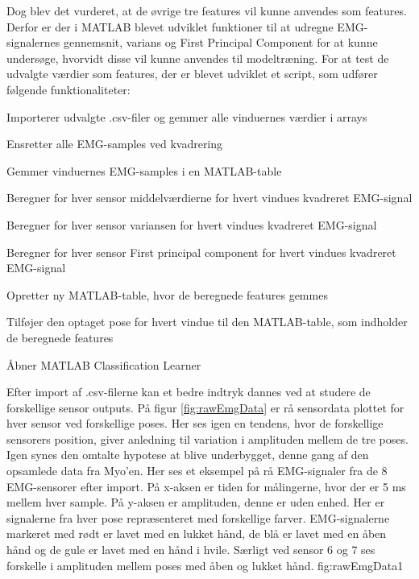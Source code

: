 Dog blev det vurderet, at de øvrige tre features vil kunne anvendes som features. Derfor er der i MATLAB blevet udviklet funktioner til at udregne EMG-signalernes gennemsnit, varians og First Principal Component for at kunne undersøge, hvorvidt disse vil kunne anvendes til modeltræning.  
For at test de udvalgte værdier som features, der er blevet udviklet et script, som udfører følgende funktionaliteter:
\begin{myItemize}
\item Importerer udvalgte .csv-filer og gemmer alle vinduernes værdier i arrays
\item Ensretter alle EMG-samples ved kvadrering 
\item Gemmer vinduernes EMG-samples i en MATLAB-table
\item Beregner for hver sensor middelværdierne for hvert vindues kvadreret EMG-signal
\item Beregner  for hver sensor variansen for hvert vindues kvadreret EMG-signal
\item Beregner  for hver sensor First principal component for hvert vindues kvadreret EMG-signal
\item Opretter ny MATLAB-table, hvor de beregnede features gemmes
\item Tilføjer den optaget pose for hvert vindue til den MATLAB-table, som indholder de beregnede features
\item Åbner MATLAB Classification Learner\citep{matlabClassificationLearner}
\end{myItemize}
Efter import af .csv-filerne kan et bedre indtryk dannes ved at studere de forskellige sensor outputs. På figur \ref{fig:rawEmgData} er rå sensordata plottet for hver sensor ved forskellige poses. Her ses igen en tendens, hvor de forskellige sensorers position, giver anledning til variation i amplituden mellem de tre poses. Igen synes den omtalte hypotese at blive underbygget, denne gang af den opsamlede data fra Myo'en.
{
	Her ses et eksempel på rå EMG-signaler fra de 8 EMG-sensorer efter import. På x-aksen er tiden for målingerne, hvor der er 5 ms mellem hver sample. På y-aksen er amplituden, denne er uden enhed. Her er signalerne fra hver pose repræsenteret med forskellige farver. EMG-signalerne markeret med rødt er lavet med en lukket hånd, de blå er lavet med en åben hånd og de gule er lavet med en hånd i hvile. Særligt ved sensor 6 og 7 ses forskelle i amplituden mellem poses med åben og lukket hånd. 
 }{fig:rawEmgData}{1}
 
